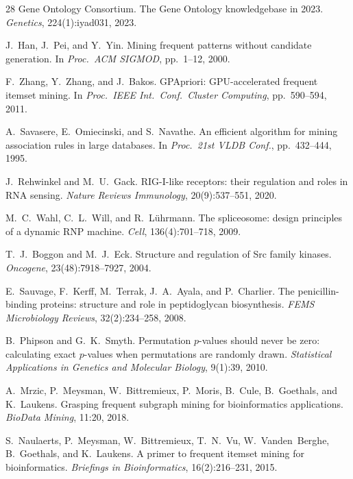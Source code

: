 \documentclass[10pt,a4paper,twocolumn]{article}
\begin{document}
\begin{thebibliography}{28}
Gene Ontology Consortium.
\newblock The Gene Ontology knowledgebase in 2023.
\newblock \emph{Genetics}, 224(1):iyad031, 2023.

J.~Han, J.~Pei, and Y.~Yin.
\newblock Mining frequent patterns without candidate generation.
\newblock In \emph{Proc.\ ACM SIGMOD}, pp.\ 1--12, 2000.

F.~Zhang, Y.~Zhang, and J.~Bakos.
\newblock GPApriori: GPU-accelerated frequent itemset mining.
\newblock In \emph{Proc.\ IEEE Int.\ Conf.\ Cluster Computing}, pp.\ 590--594, 2011.

A.~Savasere, E.~Omiecinski, and S.~Navathe.
\newblock An efficient algorithm for mining association rules in large databases.
\newblock In \emph{Proc.\ 21st VLDB Conf.}, pp.\ 432--444, 1995.

J.~Rehwinkel and M.~U.~Gack.
\newblock RIG-I-like receptors: their regulation and roles in RNA sensing.
\newblock \emph{Nature Reviews Immunology}, 20(9):537--551, 2020.

M.~C.~Wahl, C.~L.~Will, and R.~L\"uhrmann.
\newblock The spliceosome: design principles of a dynamic RNP machine.
\newblock \emph{Cell}, 136(4):701--718, 2009.

T.~J.~Boggon and M.~J.~Eck.
\newblock Structure and regulation of Src family kinases.
\newblock \emph{Oncogene}, 23(48):7918--7927, 2004.

E.~Sauvage, F.~Kerff, M.~Terrak, J.~A.~Ayala, and P.~Charlier.
\newblock The penicillin-binding proteins: structure and role in peptidoglycan biosynthesis.
\newblock \emph{FEMS Microbiology Reviews}, 32(2):234--258, 2008.

B.~Phipson and G.~K.~Smyth.
\newblock Permutation $p$-values should never be zero: calculating exact $p$-values when permutations are randomly drawn.
\newblock \emph{Statistical Applications in Genetics and Molecular Biology}, 9(1):39, 2010.

A.~Mrzic, P.~Meysman, W.~Bittremieux, P.~Moris, B.~Cule, B.~Goethals, and K.~Laukens.
\newblock Grasping frequent subgraph mining for bioinformatics applications.
\newblock \emph{BioData Mining}, 11:20, 2018.

S.~Naulaerts, P.~Meysman, W.~Bittremieux, T.~N.~Vu, W.~Vanden~Berghe, B.~Goethals, and K.~Laukens.
\newblock A primer to frequent itemset mining for bioinformatics.
\newblock \emph{Briefings in Bioinformatics}, 16(2):216--231, 2015.


\end{thebibliography}
\end{document}
